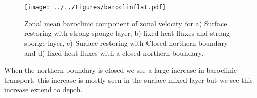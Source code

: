 \begin{figure}[H]
\noindent \texttt{[image: ../../Figures/baroclinflat.pdf]} 
\caption{Zonal mean baroclinic component of zonal velocity for a) Surface restoring with strong sponge layer, b) fixed heat fluxes and strong sponge layer, c) Surface restoring with Closed northern boundary and d) fixed heat fluxes with a closed northern boundary.}
\label{fig:baroclinflat}
\end{figure}

When the northern boundary is closed we see a large increase in baroclinic transport, this increase is mostly seen in the surface mixed layer but we see this increase extend to depth.




